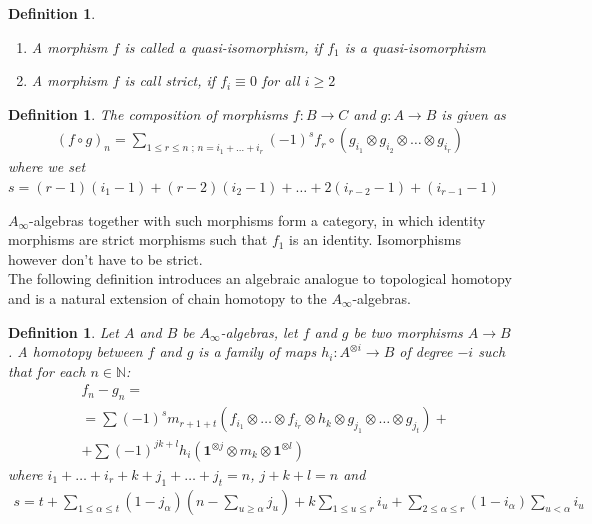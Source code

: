 \documentclass[a4paper, 12pt, openany, fleqn]{amsart}
\newtheorem{definition}[theorem]{Definition}
\begin{document}
\begin{definition}
\begin{enumerate}
    \item A morphism $f$ is called a quasi-isomorphism, if $f_1$ is a quasi-isomorphism
    \item A morphism $f$ is call strict, if $f_i \equiv 0$ for all $i\geq 2$
\end{enumerate}
\end{definition}
\begin{definition}
    The composition of morphisms $f:B\longrightarrow C$ and $g:A\longrightarrow B$ is given as
    \begin{align*}
        (f\circ g)_n = \sum_{1\leq r\leq n\text{ ; } n=i_1 +\dots +i_r} (-1)^s f_r \circ (g_{i_1}\otimes g_{i_2}\otimes\dots\otimes g_{i_r})
    \end{align*}
    where we set $s=(r-1)(i_1-1)+(r-2)(i_2-1)+\dots +2(i_{r-2}-1) + (i_{r-1}-1)$
\end{definition}
$A_\infty$-algebras together with such morphisms form a category, in which identity morphisms are strict morphisms such that $f_1$ is an identity. Isomorphisms however don't have to be strict.\\
The following definition introduces an algebraic analogue to topological homotopy and is a natural extension of chain homotopy to the $A_\infty$-algebras.
\begin{definition}
    Let $A$ and $B$ be $A_\infty$-algebras, let $f$ and $g$ be two morphisms $A\longrightarrow B$. A homotopy between $f$ and $g$ is a family of maps $h_i:A^{\otimes i}\longrightarrow B$ of degree $-i$ such that for each $n\in \mathbb{N}$:
    \begin{align*}
        &f_n - g_n =\\ &= \sum (-1)^s m_{r+1+t} (f_{i_1}\otimes\dots\otimes f_{i_r}\otimes h_k\otimes g_{j_1}\otimes\dots\otimes g_{j_t}) +\\ &+ \sum (-1)^{jk+l}h_i(\mathbf{1}^{\otimes j}\otimes m_k \otimes \mathbf{1}^{\otimes l})
    \end{align*}
    where $i_1 +\dots +i_r + k + j_1 +\dots + j_t = n$, $j+k+l=n$ and
    \begin{align*}
        s= t +\sum_{1\leq\alpha\leq t} (1-j_\alpha)(n-\sum_{u\geq \alpha} j_u) + k\sum_{1\leq u \leq r}i_u +\sum_{2\leq\alpha\leq r}(1-i_\alpha)\sum_{u<\alpha}i_u 
    \end{align*}
\end{definition}
\end{document}
